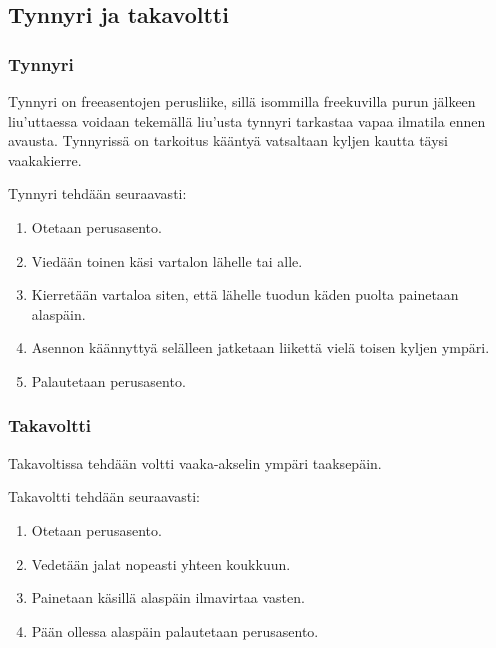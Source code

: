 \begin{multicols}{2}
\end{multicols}\pagebreak\begin{multicols}{2} 

\section{ Tynnyri ja takavoltti }
\label{pl-peruskoulutuksen-suoritukset-tynnyri-ja-takavoltti}

\subsubsection{ Tynnyri }
\label{pl-peruskoulutuksen-suoritukset-tynnyri}


Tynnyri on freeasentojen perusliike, sillä isommilla freekuvilla purun jälkeen liu’uttaessa voidaan tekemällä liu’usta tynnyri tarkastaa vapaa ilmatila ennen avausta. Tynnyrissä on tarkoitus kääntyä vatsaltaan kyljen kautta täysi vaakakierre. 


Tynnyri tehdään seuraavasti: 

\begin{enumerate}[label=\bfseries \arabic*)]
\item Otetaan perusasento. 
\item Viedään toinen käsi vartalon lähelle tai alle. 
\item Kierretään vartaloa siten, että lähelle tuodun käden puolta painetaan alaspäin. 
\item Asennon käännyttyä selälleen jatketaan liikettä vielä toisen kyljen ympäri. 
\item Palautetaan perusasento. 
\end{enumerate}
\subsubsection{ Takavoltti }
\label{pl-peruskoulutuksen-suoritukset-takavoltti}


Takavoltissa tehdään voltti vaaka-akselin ympäri taaksepäin. 


Takavoltti tehdään seuraavasti: 

\begin{enumerate}[label=\bfseries \arabic*)]
\item Otetaan perusasento. 
\item Vedetään jalat nopeasti yhteen koukkuun. 
\item Painetaan käsillä alaspäin ilmavirtaa vasten. 
\item Pään ollessa alaspäin palautetaan perusasento. 
\end{enumerate}


\end{multicols}
